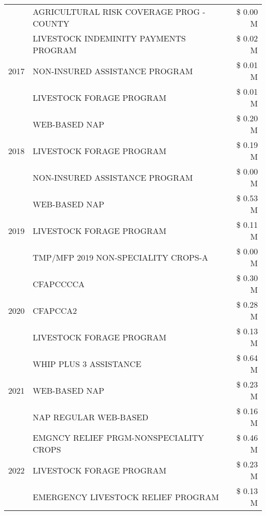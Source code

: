 \begin{tabular}{llr}
 & AGRICULTURAL RISK COVERAGE PROG - COUNTY & \$ 0.00 M \\
\cline{1-3}
\multirow[t]{3}{*}{2017} & LIVESTOCK INDEMINITY PAYMENTS PROGRAM & \$ 0.02 M \\
 & NON-INSURED ASSISTANCE PROGRAM & \$ 0.01 M \\
 & LIVESTOCK FORAGE PROGRAM & \$ 0.01 M \\
\cline{1-3}
\multirow[t]{3}{*}{2018} & WEB-BASED NAP & \$ 0.20 M \\
 & LIVESTOCK FORAGE PROGRAM & \$ 0.19 M \\
 & NON-INSURED ASSISTANCE PROGRAM & \$ 0.00 M \\
\cline{1-3}
\multirow[t]{3}{*}{2019} & WEB-BASED NAP & \$ 0.53 M \\
 & LIVESTOCK FORAGE PROGRAM & \$ 0.11 M \\
 & TMP/MFP 2019 NON-SPECIALITY CROPS-A & \$ 0.00 M \\
\cline{1-3}
\multirow[t]{3}{*}{2020} & CFAPCCCCA & \$ 0.30 M \\
 & CFAPCCA2 & \$ 0.28 M \\
 & LIVESTOCK FORAGE PROGRAM & \$ 0.13 M \\
\cline{1-3}
\multirow[t]{3}{*}{2021} & WHIP PLUS 3 ASSISTANCE & \$ 0.64 M \\
 & WEB-BASED NAP & \$ 0.23 M \\
 & NAP REGULAR WEB-BASED & \$ 0.16 M \\
\cline{1-3}
\multirow[t]{3}{*}{2022} & EMGNCY RELIEF PRGM-NONSPECIALITY CROPS & \$ 0.46 M \\
 & LIVESTOCK FORAGE PROGRAM & \$ 0.23 M \\
 & EMERGENCY LIVESTOCK RELIEF PROGRAM & \$ 0.13 M \\
\cline{1-3}
\bottomrule
\end{tabular}
